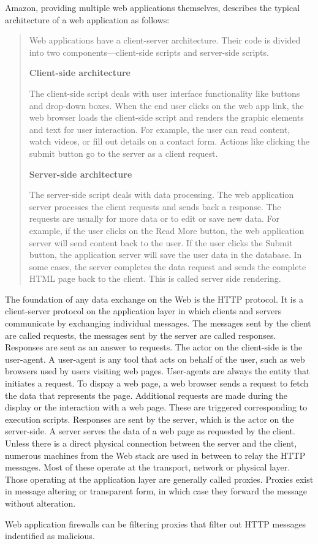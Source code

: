 Amazon, providing multiple web applications themselves, describes the typical architecture of a web application as follows:
\begin{quote}
	Web applications have a client-server architecture.
	Their code is divided into two components—client-side scripts and server-side scripts.


	\textbf{Client-side architecture}


	The client-side script deals with user interface functionality like buttons and drop-down boxes.
	When the end user clicks on the web app link, the web browser loads the client-side script and renders the graphic elements and text for user interaction.
	For example, the user can read content, watch videos, or fill out details on a contact form.
	Actions like clicking the submit button go to the server as a client request.


	\textbf{Server-side architecture}


	The server-side script deals with data processing.
	The web application server processes the client requests and sends back a response.
	The requests are usually for more data or to edit or save new data.
	For example, if the user clicks on the Read More button, the web application server will send content back to the user.
	If the user clicks the Submit button, the application server will save the user data in the database.
	In some cases, the server completes the data request and sends the complete HTML page back to the client.
	This is called server side rendering. \cite{aws/webapp}
\end{quote}
The foundation of any data exchange on the Web is the HTTP protocol.
It is a client-server protocol on the application layer in which clients and servers communicate by exchanging individual messages.
The messages sent by the client are called requests, the messages sent by the server are called responses. Responses are sent as an answer to requests. 
The actor on the client-side is the user-agent.
A user-agent is any tool that acts on behalf of the user, such as web browsers used by users visiting web pages.
User-agents are always the entity that initiates a request.
To dispay a web page, a web browser sends a request to fetch the data that represents the page.
Additional requests are made during the display or the interaction with a web page.
These are triggered corresponding to execution scripts.
Responses are sent by the server, which is the actor on the server-side.
A server serves the data of a web page as requested by the client.
Unless there is a direct physical connection between the server and the client, numerous machines from the Web stack are used in between to relay the HTTP messages.
Most of these operate at the transport, network or physical layer.
Those operating at the application layer are generally called proxies.
Proxies exist in message altering or transparent form, in which case they forward the message without alteration. \cite{mdn/http}

Web application firewalls can be filtering proxies that filter out HTTP messages indentified as malicious.


